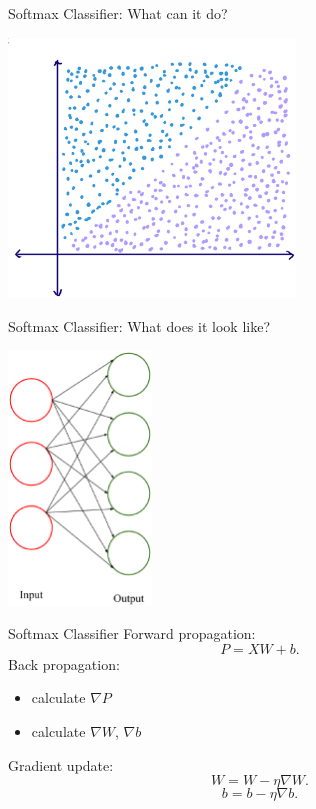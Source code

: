 \documentclass{beamer}
\begin{document}
  \begin{frame}{Softmax Classifier: What can it do?}
    \begin{center}
      \includegraphics[width=3in]{../figures/linear.eps}
    \end{center}
  \end{frame}

  \begin{frame}{Softmax Classifier: What does it look like?}
    \begin{center}
      \includegraphics[width=1.5in]{../figures/linear_classifier.eps}
    \end{center}
  \end{frame}

  \begin{frame}{Softmax Classifier}
    Forward propagation:
    $$ P = XW + b. $$
    Back propagation:
    \begin{itemize}
      \item calculate $\nabla P$
      \item calculate $\nabla W$, $\nabla b$
    \end{itemize}
    Gradient update:
    $$ W = W - \eta \nabla W. $$
    $$ b = b - \eta \nabla b. $$
  \end{frame}
\end{document}
